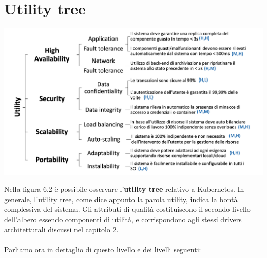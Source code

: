 \documentclass[12pt, a4paper]{report}
\begin{document}
\section{Utility tree}
\begin{center}
  \includegraphics[width=\linewidth]{Images/Kubernetes-Utilitytree}\\
\end{center}
Nella figura 6.2 è possibile osservare l'\textbf{utility tree} relativo a Kubernetes. In generale, l'utility tree, come dice appunto la parola utility, indica la bontà complessiva del sistema. Gli attributi di qualità costituiscono il secondo livello dell'albero essendo componenti di utilità, e corrispondono agli stessi drivers architetturali discussi nel capitolo 2.\\
\\
Parliamo ora in dettaglio di questo livello e dei livelli seguenti:
\end{document}
